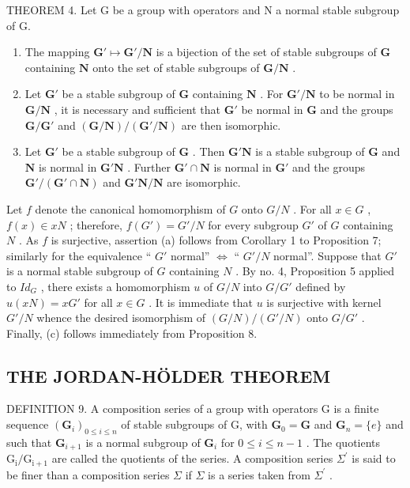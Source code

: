 THEOREM 4. Let G be a group with operators and N a normal stable subgroup of G.

\begin{enumerate}
\def\labelenumi{(\alph{enumi})}
\item
  The mapping \(\mathbf{G}' \mapsto \mathbf{G}' / \mathbf{N}\) is a bijection of the set of stable subgroups of \(\mathbf{G}\) containing \(\mathbf{N}\) onto the set of stable subgroups of \(\mathbf{G} / \mathbf{N}\) .
\item
  Let \(\mathbf{G}'\) be a stable subgroup of \(\mathbf{G}\) containing \(\mathbf{N}\) . For \(\mathbf{G}' / \mathbf{N}\) to be normal in \(\mathbf{G} / \mathbf{N}\) , it is necessary and sufficient that \(\mathbf{G}'\) be normal in \(\mathbf{G}\) and the groups \(\mathbf{G} / \mathbf{G}'\) and \((\mathbf{G} / \mathbf{N}) / (\mathbf{G}' / \mathbf{N})\) are then isomorphic.
\item
  Let \(\mathbf{G}'\) be a stable subgroup of \(\mathbf{G}\) . Then \(\mathbf{G}'\mathbf{N}\) is a stable subgroup of \(\mathbf{G}\) and \(\mathbf{N}\) is normal in \(\mathbf{G}'\mathbf{N}\) . Further \(\mathbf{G}' \cap \mathbf{N}\) is normal in \(\mathbf{G}'\) and the groups \(\mathbf{G}' / (\mathbf{G}' \cap \mathbf{N})\) and \(\mathbf{G}'\mathbf{N} / \mathbf{N}\) are isomorphic.
\end{enumerate}

Let \(f\) denote the canonical homomorphism of \(G\) onto \(G/N\) . For all \(x \in G\) , \(f(x) \in xN\) ; therefore, \(f(G') = G'/N\) for every subgroup \(G'\) of \(G\) containing \(N\) . As \(f\) is surjective, assertion (a) follows from Corollary 1 to Proposition 7; similarly for the equivalence `` \(G'\) normal'' \(\Leftrightarrow\) `` \(G'/N\) normal''. Suppose that \(G'\) is a normal stable subgroup of \(G\) containing \(N\) . By no. 4, Proposition 5 applied to \(Id_G\) , there exists a homomorphism \(u\) of \(G/N\) into \(G/G'\) defined by \(u(xN) = xG'\) for all \(x \in G\) . It is immediate that \(u\) is surjective with kernel \(G'/N\) whence the desired isomorphism of \((G/N)/(G'/N)\) onto \(G/G'\) . Finally, (c) follows immediately from Proposition 8.

\subsection{THE JORDAN-HÖLDER THEOREM}

DEFINITION 9. A composition series of a group with operators G is a finite sequence \((\mathbf{G}_i)_{0\leqslant i\leqslant n}\) of stable subgroups of G, with \(\mathbf{G}_0 = \mathbf{G}\) and \(\mathbf{G}_n = \{e\}\) and such that \(\mathbf{G}_{i + 1}\) is a normal subgroup of \(\mathbf{G}_i\) for \(0\leqslant i\leqslant n - 1\) . The quotients \(\mathrm{G_i / G_{i + 1}}\) are called the quotients of the series. A composition series \(\Sigma^{\prime}\) is said to be finer than a composition series \(\Sigma\) if \(\Sigma\) is a series taken from \(\Sigma^{\prime}\) .

